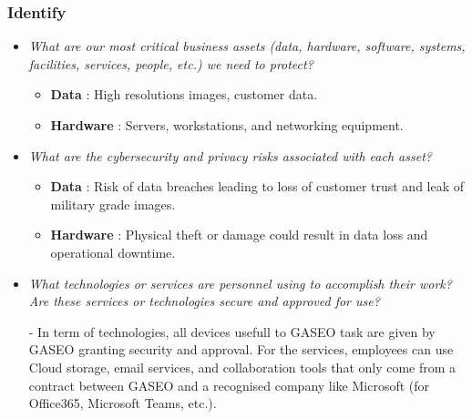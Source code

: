 \documentclass[12pt]{article}
\begin{document}
\subsubsection*{Identify}
 \begin{itemize}
     \item \textit{What are our most critical business assets (data, hardware, software, systems, facilities, services, people, etc.) we need to protect?}

    \begin{itemize}
        \item \textbf{Data} : High resolutions images, customer data.
        \item \textbf{Hardware} : Servers, workstations, and networking equipment.
    \end{itemize}
    
     \item \textit{What are the cybersecurity and privacy risks associated with each asset?} 

    \begin{itemize}
        \item \textbf{Data} : Risk of data breaches leading to loss of customer trust and leak of military grade images.
        \item \textbf{Hardware} : Physical theft or damage could result in data loss and operational downtime.
    \end{itemize}
     
     \item \textit{What technologies or services are personnel using to accomplish their work? Are these services or technologies secure and approved for use?}

     - In term of technologies, all devices usefull to GASEO task are given by GASEO granting security and approval. For the services, employees can use  Cloud storage, email services, and collaboration tools that only come  from a contract between GASEO and a recognised company like Microsoft (for Office365, Microsoft Teams, etc.). 
     
 \end{itemize}
\end{document}
